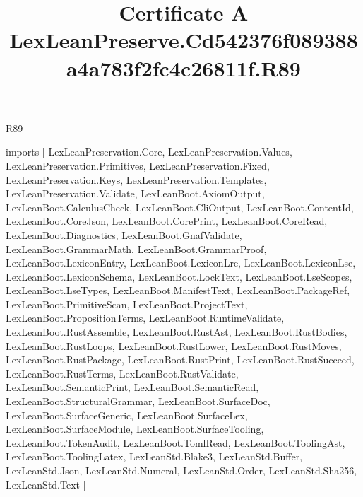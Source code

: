 \begin{lexlean}{R89}
\title{Certificate A LexLeanPreserve.Cd542376f089388a4a783f2fc4c26811f.R89}
\begin{coremodule}
imports [
  LexLeanPreservation.Core,
  LexLeanPreservation.Values,
  LexLeanPreservation.Primitives,
  LexLeanPreservation.Fixed,
  LexLeanPreservation.Keys,
  LexLeanPreservation.Templates,
  LexLeanPreservation.Validate,
  LexLeanBoot.AxiomOutput,
  LexLeanBoot.CalculusCheck,
  LexLeanBoot.CliOutput,
  LexLeanBoot.ContentId,
  LexLeanBoot.CoreJson,
  LexLeanBoot.CorePrint,
  LexLeanBoot.CoreRead,
  LexLeanBoot.Diagnostics,
  LexLeanBoot.GnafValidate,
  LexLeanBoot.GrammarMath,
  LexLeanBoot.GrammarProof,
  LexLeanBoot.LexiconEntry,
  LexLeanBoot.LexiconLre,
  LexLeanBoot.LexiconLse,
  LexLeanBoot.LexiconSchema,
  LexLeanBoot.LockText,
  LexLeanBoot.LseScopes,
  LexLeanBoot.LseTypes,
  LexLeanBoot.ManifestText,
  LexLeanBoot.PackageRef,
  LexLeanBoot.PrimitiveScan,
  LexLeanBoot.ProjectText,
  LexLeanBoot.PropositionTerms,
  LexLeanBoot.RuntimeValidate,
  LexLeanBoot.RustAssemble,
  LexLeanBoot.RustAst,
  LexLeanBoot.RustBodies,
  LexLeanBoot.RustLoops,
  LexLeanBoot.RustLower,
  LexLeanBoot.RustMoves,
  LexLeanBoot.RustPackage,
  LexLeanBoot.RustPrint,
  LexLeanBoot.RustSucceed,
  LexLeanBoot.RustTerms,
  LexLeanBoot.RustValidate,
  LexLeanBoot.SemanticPrint,
  LexLeanBoot.SemanticRead,
  LexLeanBoot.StructuralGrammar,
  LexLeanBoot.SurfaceDoc,
  LexLeanBoot.SurfaceGeneric,
  LexLeanBoot.SurfaceLex,
  LexLeanBoot.SurfaceModule,
  LexLeanBoot.SurfaceTooling,
  LexLeanBoot.TokenAudit,
  LexLeanBoot.TomlRead,
  LexLeanBoot.ToolingAst,
  LexLeanBoot.ToolingLatex,
  LexLeanStd.Blake3,
  LexLeanStd.Buffer,
  LexLeanStd.Json,
  LexLeanStd.Numeral,
  LexLeanStd.Order,
  LexLeanStd.Sha256,
  LexLeanStd.Text
]


\end{coremodule}
\end{lexlean}
